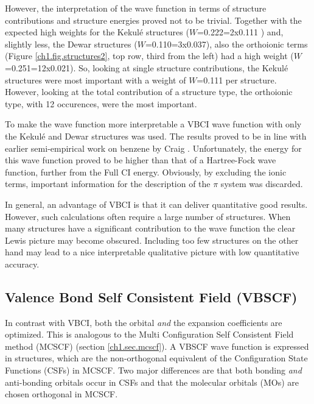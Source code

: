 However, the interpretation of the wave function in terms of structure contributions and structure energies proved not  to be trivial. Together with the expected high weights for the Kekul\'{e} structures ($W$=0.222=2x0.111 \cite{vbci175_2}) and, slightly less, the Dewar structures ($W$=0.110=3x0.037), also the orthoionic terms (Figure \ref{ch1.fig.structures2}, top row, third from the left) had a high weight ($W$=0.251=12x0.021). So, looking at single structure contributions, the Kekul\'e structures were most important with a weight of $W$=0.111 per structure. However, looking at the total contribution of a structure type, the orthoionic type, with 12 occurences, were the most important.

To make the wave function more interpretable a VBCI wave function with only the Kekul\'{e} and Dewar structures was used. The results proved to be in line with earlier semi-empirical work on benzene by Craig \cite{craig}. Unfortunately, the energy for this wave function proved to be higher than that of a Hartree-Fock wave function, further from the Full CI energy. Obviously, by excluding the ionic terms, important information for the description of the $\pi$ system was discarded.

In general, an advantage of VBCI is that it can deliver quantitative good results. However, such calculations often require a large number of structures. When many structures have a significant contribution to the wave function the clear Lewis picture may become obscured. Including too few structures on the other hand may lead to a nice interpretable qualitative picture with low quantitative accuracy. 

\subsection{\label{ch1.sec.vbscf}Valence Bond Self Consistent Field (VBSCF)}

In contrast with VBCI, both the orbital \textit{and} the expansion coefficients are optimized. This is analogous to the Multi Configuration Self Consistent Field method (MCSCF) (section \ref{ch1.sec.mcscf}). A VBSCF wave function is  expressed in structures, which are the non-orthogonal equivalent of the Configuration State Functions (CSFs) in MCSCF.  Two major differences are that both bonding \textit{and} anti-bonding orbitals occur in CSFs and that the molecular orbitals (MOs) are chosen orthogonal in MCSCF.

